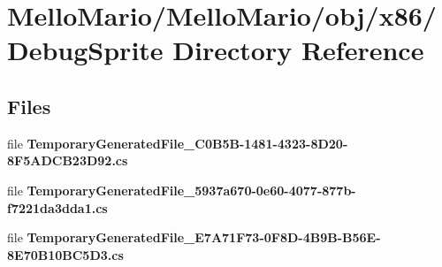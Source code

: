 \section{Mello\+Mario/\+Mello\+Mario/obj/x86/\+Debug\+Sprite Directory Reference}
\label{dir_5d12d40169a0eac2709aca16caa0bbf3}
\subsection*{Files}
\begin{DoxyCompactItemize}
\item 
file \textbf{ Temporary\+Generated\+File\+\_\+C0\+B5\+B-\/1481-\/4323-\/8\+D20-\/8\+F5\+A\+D\+C\+B23\+D92.\+cs}
\item 
file \textbf{ Temporary\+Generated\+File\+\_\+5937a670-\/0e60-\/4077-\/877b-\/f7221da3dda1.\+cs}
\item 
file \textbf{ Temporary\+Generated\+File\+\_\+\+E7\+A71\+F73-\/0\+F8\+D-\/4\+B9\+B-\/\+B56\+E-\/8\+E70\+B10\+B\+C5\+D3.\+cs}
\end{DoxyCompactItemize}
